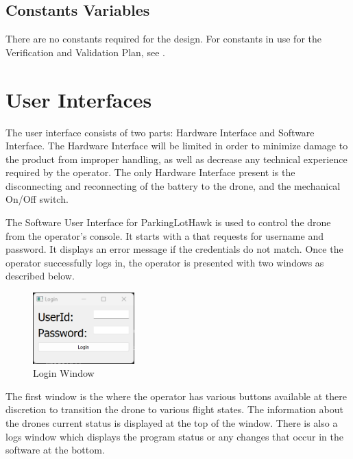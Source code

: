 \documentclass[12pt, titlepage]{article}
\begin{document}
\clearpage

\subsection{Constants Variables}
\label{subsec:Constants Variables}

There are no constants required for the design. For constants in use for the Verification and Validation Plan, see .

\section{User Interfaces}
\label{sec:ui}

The user interface consists of two parts: Hardware Interface and Software Interface. The Hardware Interface will be limited in order to minimize damage to the product from improper handling, as well as decrease any technical experience required by the operator. The only Hardware Interface present is the disconnecting and reconnecting of the battery to the drone, and the mechanical On/Off switch.

The Software User Interface for ParkingLotHawk is used to control the drone from the operator’s console. It starts with a  that requests for username and password. It displays an error message if the credentials do not match. Once the operator successfully logs in, the operator is presented with two windows as described below. \\

\begin{figure}[h!]
  \begin{center} 
  \caption{Login Window}
  \label{LoginWindow}
        \includegraphics[width=0.35\textwidth]{MainLogin.png}
  \end{center}
\end{figure}


The first window is the  where the operator has various buttons available at there discretion to transition the drone to various flight states. The information about the drones current status is displayed at the top of the window. There is also a logs window which displays the program status or any changes that occur in the software at the bottom. \\
\end{document}
